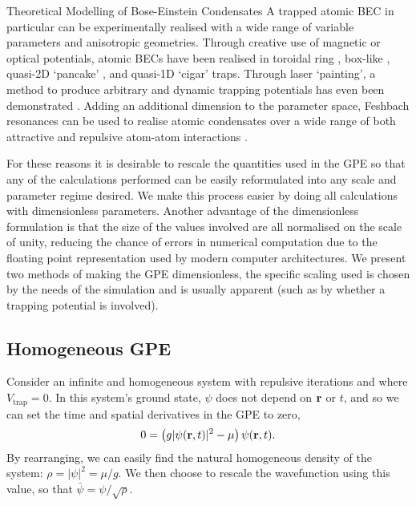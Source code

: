 \begin{chapter}{\label{cha:theoretical_model}Theoretical Modelling of Bose-Einstein Condensates}
	A trapped atomic BEC in particular can be experimentally realised with a wide range of variable parameters and anisotropic geometries. Through creative use of magnetic or optical potentials, atomic BECs have been realised in toroidal ring \cite{persistent,Ramanathan11}, box-like \cite{gaunt_2013,chomaz_2015}, quasi-2D `pancake' \cite{Neely}, and quasi-1D `cigar' \cite{Burger99,Weller08} traps. Through laser `painting', a method to produce arbitrary and dynamic trapping potentials has even been demonstrated \cite{Henderson09}. Adding an additional dimension to the parameter space, Feshbach resonances can be used to realise atomic condensates over a wide range of both attractive and repulsive atom-atom interactions \cite{Inouye1998}.

	For these reasons it is desirable to rescale the quantities used in the GPE so that any of the calculations performed can be easily reformulated into any scale and parameter regime desired. We make this process easier by doing all calculations with dimensionless parameters. Another advantage of the dimensionless formulation is that the size of the values involved are all normalised on the scale of unity, reducing the chance of errors in numerical computation due to the floating point representation used by modern computer architectures.
	We present two methods of making the GPE dimensionless, the specific scaling used is chosen by the needs of the simulation and is usually apparent (such as by whether a trapping potential is involved).

	\subsection{\label{section:gpedimlesshomg} Homogeneous GPE}
		Consider an infinite and homogeneous system with repulsive iterations and where $V_{\mathrm{trap}} = 0$. In this system's ground state, $\psi$ does not depend on ${\bf r}$ or $t$, and so we can set the time and spatial derivatives in the GPE to zero,
		\begin{equation}
		0 = \left(g|\psi({\bf r},t)|^2 - \mu \right) \psi({\bf r},t).
		\end{equation}
		By rearranging, we can easily find the natural homogeneous density of the system: $\rho = |\psi|^2 = \mu/g$. We then choose to rescale the wavefunction using this value, so that $\bar{\psi} = \psi/\sqrt{\rho}$.


\end{chapter}
